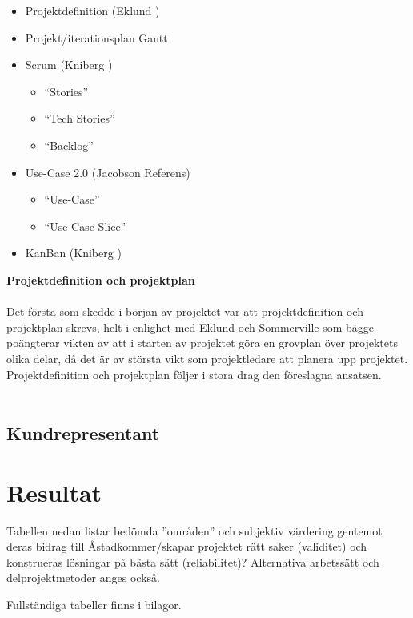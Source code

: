 \documentclass[conference,a4paper]{IEEEtran}
\begin{document}
\begin{itemize}
\item Projektdefinition (Eklund \cite[s. 137-146]{Eklund14})
\item Projekt/iterationsplan Gantt
\item Scrum (Kniberg \cite{Kniberg07})
\begin{itemize}
	\item ``Stories''
    \item ``Tech Stories''
    \item ``Backlog''
\end{itemize}
\item Use-Case 2.0 (Jacobson Referens)
	\begin{itemize}
	\item ``Use-Case''
  \item ``Use-Case Slice''
  \end{itemize}
\item KanBan (Kniberg \cite{Kniberg10})
\end{itemize}

\textbf{Projektdefinition och projektplan}\\
\\
Det första som skedde i början av projektet var att projektdefinition och projektplan skrevs, helt i enlighet med Eklund \cite[s. 138-139]{Eklund14} och Sommerville \cite[s. 619]{Sommerville10} som bägge poängterar vikten av att i starten av projektet göra en grovplan över projektets olika delar, då det är av största vikt som projektledare att planera upp projektet. Projektdefinition och projektplan följer i stora drag den föreslagna ansatsen.\\
\\


\subsection{Kundrepresentant}

\section{Resultat} \label{sec:res}
Tabellen nedan listar bedömda ”områden” och subjektiv värdering gentemot deras bidrag till Åstadkommer/skapar projektet rätt saker (validitet) och konstrueras lösningar på bästa sätt (reliabilitet)? Alternativa arbetssätt och delprojektmetoder anges också.

Fullständiga tabeller finns i bilagor.
\end{document}
